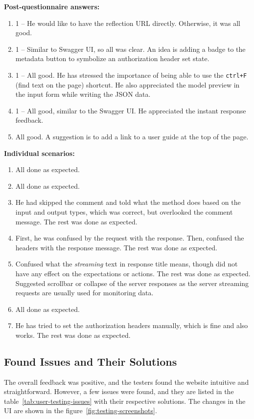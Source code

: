 \textbf{Post-questionnaire answers:}
\begin{enumerate}
    \item 1 -- He would like to have the reflection URL directly.
    Otherwise, it was all good.
    \item 1 -- Similar to Swagger UI, so all was clear.
    An idea is adding a badge to the metadata button to symbolize an authorization header set state.
    \item 1 -- All good.
    He has stressed the importance of being able to use the \verb|ctrl+F| (find text on the page) shortcut.
    He also appreciated the model preview in the input form while writing the JSON data.
    \item 1 -- All good, similar to the Swagger UI\@.
    He appreciated the instant response feedback.
    \item All good.
    A suggestion is to add a link to a user guide at the top of the page.
\end{enumerate}

\newpage

\textbf{Individual scenarios:}
\begin{enumerate}
    \item All done as expected.
    \item All done as expected.
    \item He had skipped the comment and told what the method does based on the input and output types, which was correct, but overlooked the comment message.
    The rest was done as expected.
    \item First, he was confused by the request with the response.
    Then, confused the headers with the response message.
    The rest was done as expected.
    \item Confused what the \textit{streaming} text in response title means, though did not have any effect on the expectations or actions.
    The rest was done as expected.
    Suggested scrollbar or collapse of the server responses as the server streaming requests are usually used for monitoring data.
    \item All done as expected.
    \item He has tried to set the authorization headers manually, which is fine and also works.
    The rest was done as expected.
\end{enumerate}

\subsection{Found Issues and Their Solutions}\label{subsec:found-issues-and-their-solutions}
The overall feedback was positive, and the testers found the website intuitive and straightforward.
However, a few issues were found, and they are listed in the table~\ref{tab:user-testing-issues} with their respective solutions.
The changes in the UI are shown in the figure~\ref{fig:testing-screenshots}.


